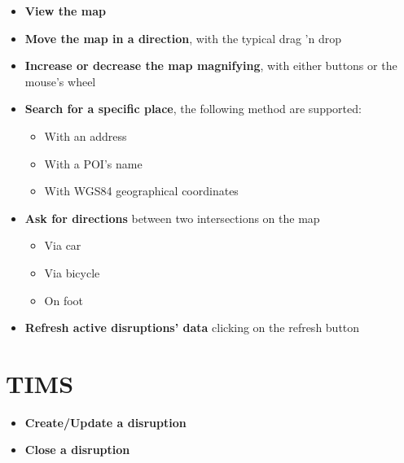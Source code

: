 \begin{itemize}
	\item \textbf{View the map}
	\item \textbf{Move the map in a direction}, with the typical drag 'n drop
	\item \textbf{Increase or decrease the map magnifying}, with either buttons 
	or the mouse's wheel
	\item \textbf{Search for a specific place}, the following method are 
	supported:
	\begin{itemize}
		\item With an address
		\item With a POI's name
		\item With WGS84 geographical coordinates
	\end{itemize}
	\item \textbf{Ask for directions} between two intersections on the map
	\begin{itemize}
		\item Via car
		\item Via bicycle
		\item On foot
	\end{itemize}
	\item \textbf{Refresh active disruptions' data} clicking on the refresh button
\end{itemize}
\section{TIMS}
	\begin{itemize}
	\item \textbf{Create/Update a disruption}
	\item \textbf{Close a disruption}
	
	\end{itemize}
